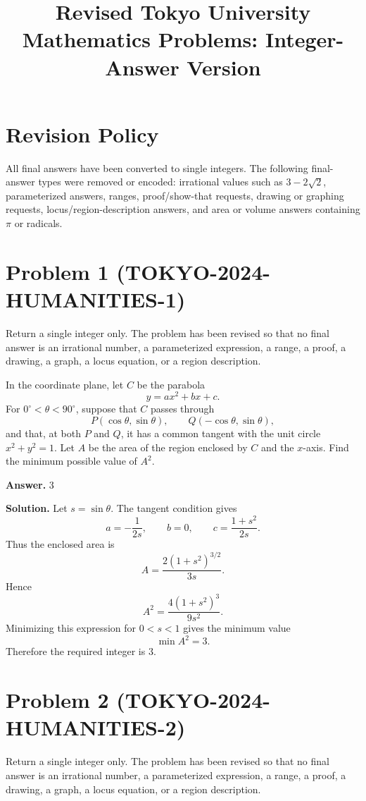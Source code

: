 \documentclass[11pt]{article}
\title{Revised Tokyo University Mathematics Problems: Integer-Answer Version}
\author{}
\date{}
\begin{document}
\maketitle

\section*{Revision Policy}
All final answers have been converted to single integers. The following final-answer types were removed or encoded: irrational values such as $3-2\sqrt2$, parameterized answers, ranges, proof/show-that requests, drawing or graphing requests, locus/region-description answers, and area or volume answers containing $\pi$ or radicals.

\section*{Problem 1 (TOKYO-2024-HUMANITIES-1)}

Return a single integer only. The problem has been revised so that no final answer is an irrational number, a parameterized expression, a range, a proof, a drawing, a graph, a locus equation, or a region description.

In the coordinate plane, let \(C\) be the parabola
\[
y=ax^2+bx+c.
\]
For \(0^\circ<\theta<90^\circ\), suppose that \(C\) passes through
\[
P(\cos\theta,\sin\theta),\qquad Q(-\cos\theta,\sin\theta),
\]
and that, at both \(P\) and \(Q\), it has a common tangent with the unit circle
\(x^2+y^2=1\). Let \(A\) be the area of the region enclosed by \(C\) and the
\(x\)-axis. Find the minimum possible value of \(A^2\).


\textbf{Answer.} 3


\textbf{Solution.}
Let \(s=\sin\theta\). The tangent condition gives
\[
a=-\frac{1}{2s},\qquad b=0,
\qquad c=\frac{1+s^2}{2s}.
\]
Thus the enclosed area is
\[
A=\frac{2(1+s^2)^{3/2}}{3s}.
\]
Hence
\[
A^2=\frac{4(1+s^2)^3}{9s^2}.
\]
Minimizing this expression for \(0<s<1\) gives the minimum value
\[
\min A^2=3.
\]
Therefore the required integer is \(3\).


\section*{Problem 2 (TOKYO-2024-HUMANITIES-2)}

Return a single integer only. The problem has been revised so that no final answer is an irrational number, a parameterized expression, a range, a proof, a drawing, a graph, a locus equation, or a region description.
\end{document}
